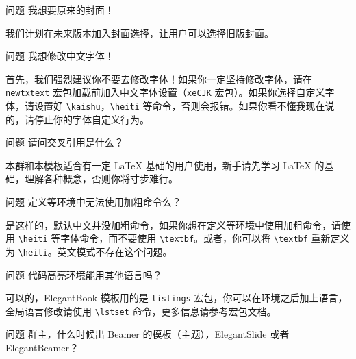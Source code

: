 \documentclass[cn,11pt]{elegantbook}
\begin{document}
\begin{custom}{问题}
我想要原来的封面！
\end{custom}

\begin{solution}
我们计划在未来版本加入封面选择，让用户可以选择旧版封面。
\end{solution}

\begin{custom}{问题}
我想修改中文字体！
\end{custom}

\begin{solution}
首先，我们{\heiti 强烈建议你不要去修改字体}！如果你一定坚持修改字体，请在 \lstinline{newtxtext} 宏包加载前加入中文字体设置（\lstinline{xeCJK} 宏包）。如果你选择自定义字体，请设置好 \lstinline{\kaishu}，\lstinline{\heiti} 等命令，否则会报错。如果你看不懂我现在说的，请停止你的字体自定义行为。
\end{solution}

\begin{custom}{问题}
请问交叉引用是什么？
\end{custom}

\begin{solution}
本群和本模板适合有一定 \LaTeX{} 基础的用户使用，新手请先学习 \LaTeX{} 的基础，理解各种概念，否则你将寸步难行。
\end{solution}

\begin{custom}{问题}
定义等环境中无法使用加粗命令么？
\end{custom}

\begin{solution}
是这样的，默认中文并没加粗命令，如果你想在定义等环境中使用加粗命令，请使用 \lstinline{\heiti} 等字体命令，而不要使用 \lstinline{\textbf}。或者，你可以将 \lstinline{\textbf} 重新定义为 \lstinline{\heiti}。英文模式不存在这个问题。
\end{solution}

\begin{custom}{问题}
代码高亮环境能用其他语言吗？
\end{custom}

\begin{solution}
可以的，ElegantBook 模板用的是 \lstinline{listings} 宏包，你可以在环境之后加上语言，全局语言修改请使用 \lstinline{\lstset} 命令，更多信息请参考宏包文档。
\end{solution}


\begin{custom}{问题}
群主，什么时候出 Beamer 的模板（主题），ElegantSlide 或者 ElegantBeamer？
\end{custom}
\end{document}
